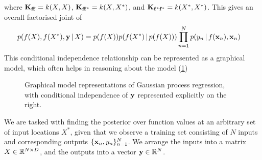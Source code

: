 \documentclass[a4paper]{article}
\newcommand{\fixgmfont}[1]{\scalebox{0.8}{#1}}
\theoremstyle{definition}
\begin{document}
where $\mathbf{K}_{\mathbf{f}\mathbf{f}} = k(X, X)$, $\mathbf{K}_{\mathbf{f}\mathbf{f}^*} = k(X, X^*)$, and $\mathbf{K}_{\mathbf{f}^*\mathbf{f}^*} = k(X^*, X^*)$.
This gives an overall factorised joint of
\begin{align}
p(f(X), f(X^*), \mathbf{y}\,|\, X) &= p(f(X)) p(f(X^*)\,|\, p(f(X))) \prod_{n=1}^N p(y_n\,|\, f(\mathbf{x}_n), \mathbf{x}_n)
\end{align}
This conditional independence relationship can be represented as a graphical model, which often helps in reasoning about the model (\cref{fig:gp-gm})

\begin{figure}[h]
\centering
{}
\hspace{3.0cm}
\caption{Graphical model representations of Gaussian process regression, with conditional independence of $\mathbf{y}$ represented explicitly on the right.}
\label{fig:gp-gm}
\end{figure}




We are tasked with finding the posterior over function values at an arbitrary set of input locations $X^*$, given that we observe a training set consisting of $N$ inputs and corresponding outputs $\{\mathbf{x}_n, y_n\}_{n=1}^N$. We arrange the inputs into a matrix $X \in \mathbb{R}^{N\times D}$, and the outputs into a vector $\mathbf{y}\in\mathbb{R}^N$.
\end{document}
